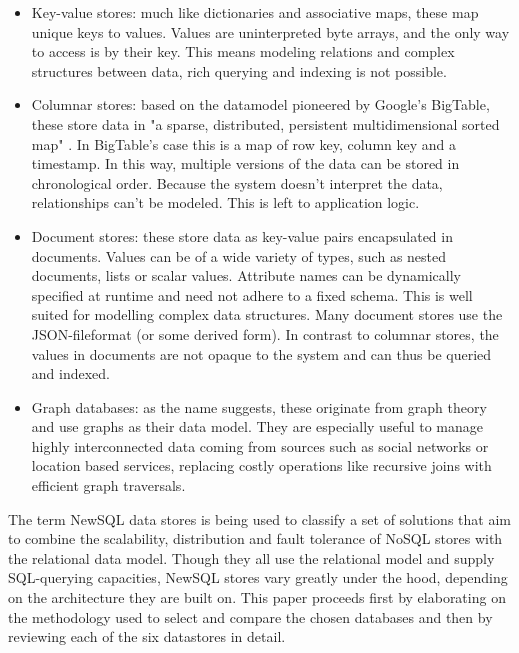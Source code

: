 \documentclass{IEEEtran}
\begin{document}
\begin{itemize}
\item Key-value stores: much like dictionaries and associative maps, these map unique keys to values. Values are uninterpreted byte arrays, and the only way to access is by their key. This means modeling relations and complex structures between data, rich querying and indexing is not possible\cite{hecht2011nosql}\cite{grolinger2013data}. 
\item Columnar stores: based on the datamodel pioneered by Google's BigTable, these store data in "a sparse, distributed, persistent multidimensional sorted map" \cite{chang2008bigtable}. In BigTable's case this is a map of row key, column key and a timestamp. In this way, multiple versions of the data can be stored in chronological order. Because the system doesn't interpret the data, relationships can't be modeled. This is left to application logic\cite{hecht2011nosql}.
\item Document stores: these store data as key-value pairs encapsulated in documents. Values can be of a wide variety of types, such as nested documents, lists or scalar values. Attribute names can be dynamically specified at runtime and need not adhere to a fixed schema\cite{cattell2011scalable}. This is well suited for modelling complex data structures. Many document stores use the JSON-fileformat (or some derived form). In contrast to columnar stores, the values in documents are not opaque to the system and can thus be queried and indexed\cite{hecht2011nosql}.
\item Graph databases: as the name suggests, these originate from graph theory and use graphs as their data model. They are especially useful to manage highly interconnected data coming from sources such as social networks or location based services, replacing costly operations like recursive joins with efficient graph traversals\cite{hecht2011nosql}.
\end{itemize}
The term NewSQL data stores is being used to classify a set of solutions that aim to combine the scalability, distribution and fault tolerance of NoSQL stores with the relational data model. Though they all use the relational model and supply SQL-querying capacities, NewSQL stores vary greatly under the hood, depending on the architecture they are built on\cite{grolinger2013data}. This paper proceeds first by elaborating on the methodology used to select and compare the chosen databases and then by reviewing each of the six datastores in detail.
\end{document}
